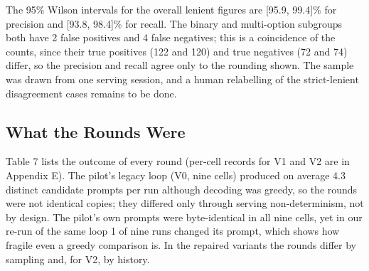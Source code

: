 \documentclass{ieeeaccess}
\begin{document}
The 95\% Wilson intervals for the overall lenient figures are [95.9, 99.4]\% for precision and [93.8, 98.4]\% for recall. The binary and multi-option subgroups both have 2 false positives and 4 false negatives; this is a coincidence of the counts, since their true positives (122 and 120) and true negatives (72 and 74) differ, so the precision and recall agree only to the rounding shown. The sample was drawn from one serving session, and a human relabelling of the strict-lenient disagreement cases remains to be done.

\subsection{What the Rounds Were}

Table 7 lists the outcome of every round (per-cell records for V1 and V2 are in Appendix E). The pilot's legacy loop (V0, nine cells) produced on average 4.3 distinct candidate prompts per run although decoding was greedy, so the rounds were not identical copies; they differed only through serving non-determinism, not by design. The pilot's own prompts were byte-identical in all nine cells, yet in our re-run of the same loop 1 of nine runs changed its prompt, which shows how fragile even a greedy comparison is. In the repaired variants the rounds differ by sampling and, for V2, by history.
\end{document}
